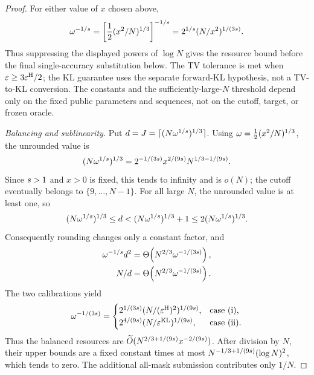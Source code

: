 \begin{proof}
For either value of $x$ chosen above,
\[
 \omega^{-1/s}
 =\left[\frac12(x^2/N)^{1/3}\right]^{-1/s}
 =2^{1/s}
        (N/x^2)^{1/(3s)}.
\]
Thus suppressing the displayed powers of $\log N$ gives the resource
bound before the final single-accuracy substitution below.
The TV tolerance is met when
$\varepsilon\ge3\varepsilon^{\mathrm H}/2$; the KL guarantee uses the separate
forward-KL hypothesis, not a TV-to-KL conversion.
The constants and the sufficiently-large-$N$ threshold depend only on the
fixed public parameters and sequences, not on the cutoff, target, or
frozen oracle.

\emph{Balancing and sublinearity.}
Put
$d=J=
 \lceil(N\omega^{1/s})^{1/3}\rceil$.
Using $\omega=\frac12(x^2/N)^{1/3}$, the unrounded value is
\[
 (N\omega^{1/s})^{1/3}
 =2^{-1/(3s)}
       x^{2/(9s)}N^{1/3-1/(9s)}.
\]
Since $s>1$ and $x>0$ is fixed, this tends to infinity
and is $o(N)$; the cutoff eventually belongs to $\{9,\ldots,N-1\}$.
For all large $N$, the unrounded value is at least one, so
\[
 (N\omega^{1/s})^{1/3}
 \le d
 <(N\omega^{1/s})^{1/3}+1
 \le2(N\omega^{1/s})^{1/3}.
\]
Consequently rounding changes only a constant factor, and
\[
 \begin{aligned}
 \omega^{-1/s}d^2
 &=\Theta\!\left(
     N^{2/3}\omega^{-1/(3s)}\right),\\
 N/d
 &=\Theta\!\left(
     N^{2/3}\omega^{-1/(3s)}\right).
 \end{aligned}
\]
The two calibrations yield
\[
 \omega^{-1/(3s)}
 =
 \begin{cases}
 2^{1/(3s)}
 (N/(\varepsilon^{\mathrm H})^2)^{1/(9s)},&\text{case~(i)},\\
 2^{4/(9s)}
 (N/\varepsilon^{\mathrm{KL}})^{1/(9s)},&\text{case~(ii)}.
 \end{cases}
\]
Thus the balanced resources are
$\widetilde O(N^{2/3+1/(9s)}x^{-2/(9s)})$.
After division by $N$, their upper bounds are a fixed constant
times at most
$N^{-1/3+1/(9s)}(\log N)^2$, which tends to zero.
The additional all-mask submission contributes only $1/N$.


\end{proof}
